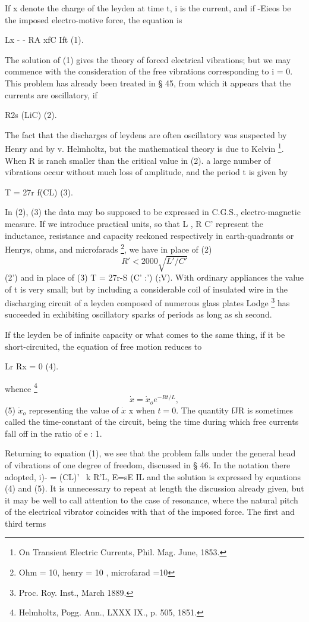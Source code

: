 If x denote the charge of the leyden at time t, i is the current, and if -Eieos
be the imposed electro-motive force, the equation is

Lx - - RA xfC  Ift (1).

The solution of (1) gives the theory of forced electrical vibrations; but we
may commence with the consideration of the free vibrations corresponding to i =
0. This problem has already been treated in § 45, from which it appears that
the currents are oscillatory, if

R2s (LiC) (2).

The fact that the discharges of leydens are often oscillatory was suspected by
Henry and by v. Helmholtz, but the mathematical theory is due to Kelvin
\footnote{On Transient Electric Currents, Phil. Mag.  June, 1853.}.
When R is ranch smaller than the critical value in (2). a large number of
vibrations occur without much loss of amplitude, and the period t is given by

T = 27r f(CL) (3).

In (2), (3) the data may bo supposed to be expressed in C.G.S.,
electro-magnetic measure. If we introduce practical units, so that L , R C'
represent the inductance, resistance and capacity reckoned respectively in
earth-quadrants or Henrys, ohms, and microfarads
\footnote{Ohm = 10, henry = 10 , microfarad =10}, we have in place of (2)
\[ R' < 2000 \sqrt{ L'/C' } \]
(2')  and in place of (3)
T = 27r-S (C' :') (;V).
With ordinary appliances the value of t is very small; but by
including a considerable coil of insulated wire in the
discharging circuit of a leyden composed of numerous glass plates Lodge
\footnote{Proc. Roy. Inst., March 1889.} has
succeeded in exhibiting oscillatory sparks of periods as long as sh second.

If the leyden be of infinite capacity or what comes to the same thing, if it
be short-circuited, the equation of free motion reduces to

Lr Rx = 0 (4).

whence \footnote{Helmholtz, Pogg. Ann., LXXX IX., p. 505, 1851.}
\[\dot{x}=\dot{x}_o e^{ -R t/L}, \]
(5) \(\dot{x}_o\) representing the value of \(\dot{x}\)
x when  \(t= 0\). The quantity fJR is
sometimes called the time-constant of the circuit, being the time during which
free currents fall off in the ratio of e : 1.

Returning to equation (1), we see that the problem falls under the general head
of vibrations of one degree of freedom, discussed in § 46. In the notation
there adopted, i)- = (CL)'~ k R'L, E=sE IL  and the solution is expressed by
equations (4) and (5).  It is unnecessary to repeat at length the discussion
already given, but it may be well to call attention to the case of resonance,
where the natural pitch of the electrical vibrator coincides with that of the
imposed force.  The first and third terms

